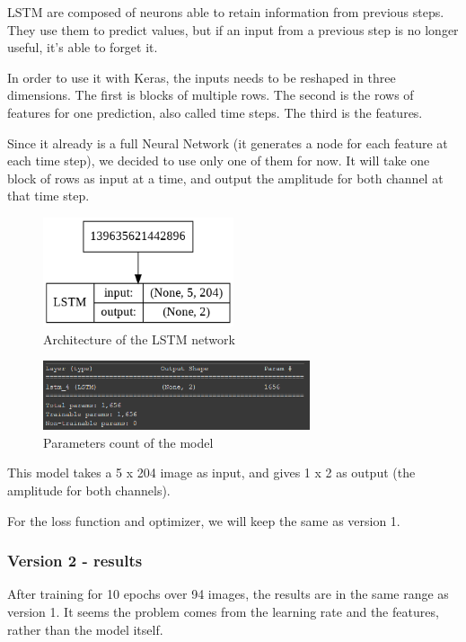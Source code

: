 \documentclass[12pt, twoside]{article}
\begin{document}
LSTM are composed of neurons able to retain information from previous steps. They use them to predict values, but if an input from a previous step is no longer useful, it's able to forget it.

In order to use it with Keras, the inputs needs to be reshaped in three dimensions. The first is blocks of multiple rows. The second is the rows of features for one prediction, also called time steps. The third is the features.


Since it already is a full Neural Network (it generates a node for each feature at each time step), we decided to use only one of them for now. It will take one block of rows as input at a time, and output the amplitude for both channel at that time step.

\begin{figure}[H]
	\centering
	\includegraphics[width=0.5\textwidth]{../images/model_v2.png}
	\caption{Architecture of the LSTM network}
	\label{archiv2}
\end{figure}

\begin{figure}[H]
	\centering
	\includegraphics[width=0.7\textwidth]{../images/model_v2_params.png}
	\caption{Parameters count of the model}
	\label{paramv2}
\end{figure}

This model takes a 5 x 204 image as input, and gives 1 x 2 as output (the amplitude for both channels).

For the loss function and optimizer, we will keep the same as version 1.

\subsubsection{Version 2 - results}
After training for 10 epochs over 94 images, the results are in the same range as version 1. It seems the problem comes from the learning rate and the features, rather than the model itself.
\end{document}
